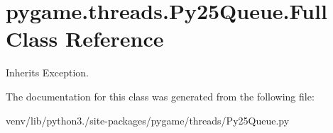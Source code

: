 \hypertarget{classpygame_1_1threads_1_1_py25_queue_1_1_full}{}\section{pygame.\+threads.\+Py25\+Queue.\+Full Class Reference}
\label{classpygame_1_1threads_1_1_py25_queue_1_1_full}


Inherits Exception.



The documentation for this class was generated from the following file\+:\begin{DoxyCompactItemize}
\item 
venv/lib/python3./site-\/packages/pygame/threads/Py25\+Queue.\+py\end{DoxyCompactItemize}
